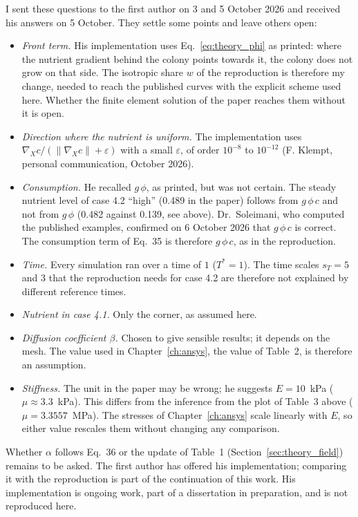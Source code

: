 I sent these questions to the first author on 3 and 5 October 2026 and
received his answers on 5 October. They settle some points and leave others
open:
\begin{itemize}
  \item \emph{Front term.} His implementation uses Eq.~\eqref{eq:theory_phi}
        as printed: where the nutrient gradient behind the colony points
        towards it, the colony does not grow on that side. The isotropic
        share $w$ of the reproduction is therefore my change, needed to
        reach the published curves with the explicit scheme used here.
        Whether the finite element solution of the paper reaches them
        without it is open.
  \item \emph{Direction where the nutrient is uniform.} The implementation
        uses $\nabla_X c/(\|\nabla_X c\|+\varepsilon)$ with a small
        $\varepsilon$, of order $10^{-8}$ to $10^{-12}$ (F. Klempt, personal
        communication, October 2026).
  \item \emph{Consumption.} He recalled $g\,\phi$, as printed, but was not
        certain. The steady nutrient level of case 4.2 ``high'' (0.489 in
        the paper) follows from $g\,\phi\,c$ and not from $g\,\phi$
        (0.482 against 0.139, see above). Dr.\ Soleimani, who computed the
        published examples, confirmed on 6 October 2026 that $g\,\phi\,c$
        is correct. The consumption term of Eq.~35 is therefore
        $g\,\phi\,c$, as in the reproduction.
  \item \emph{Time.} Every simulation ran over a time of $1$ ($T^*=1$). The time
        scales $s_T=5$ and $3$ that the reproduction needs for case 4.2 are
        therefore not explained by different reference times.
  \item \emph{Nutrient in case 4.1.} Only the corner, as assumed here.
  \item \emph{Diffusion coefficient $\beta$.} Chosen to give sensible
        results; it depends on the mesh. The value used in
        Chapter~\ref{ch:ansys}, the value of Table~2, is
        therefore an assumption.
  \item \emph{Stiffness.} The unit in the paper may be wrong; he suggests
        $E=10$~kPa ($\mu\approx3.3$~kPa). This differs from the inference
        from the plot of Table~3 above ($\mu=3.3557$~MPa). The stresses of
        Chapter~\ref{ch:ansys} scale linearly with $E$, so either value
        rescales them without changing any comparison.
\end{itemize}
Whether $\alpha$ follows Eq.~36 or the update of Table~1
(Section~\ref{sec:theory_field}) remains to be asked. The first author has
offered his implementation; comparing it with the reproduction is part of
the continuation of this work. His implementation is ongoing work, part of a
dissertation in preparation, and is not reproduced here.
